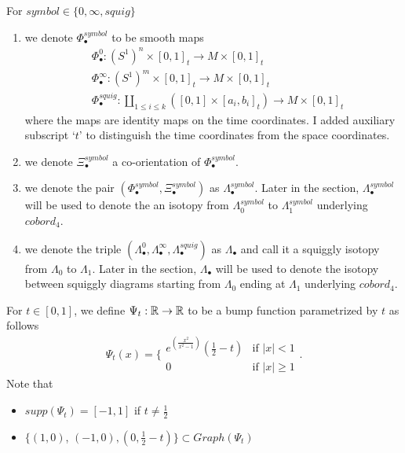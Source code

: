 \begin{definition}
For $symbol\in\{0,\infty, squig \}$
\begin{enumerate}
\item we denote $\Phi_\bullet^{symbol}$ to be smooth maps
\begin{align*}
&\Phi_\bullet^0 : (S^1)^n \times [0,1]_t \rightarrow M \times [0,1]_t \\
&\Phi_\bullet^\infty : (S^1)^m \times [0,1]_t \rightarrow M \times [0,1]_t \\
&\Phi_\bullet^{squig} : \coprod_{1\leq i \leq k} ([0,1] \times [a_i,b_i]_t) \rightarrow M \times [0,1]_t
\end{align*}
where the maps are identity maps on the time coordinates. I added auxiliary subscript `$t$' to distinguish the time coordinates from the space coordinates.

\item we denote $\Xi_\bullet^{symbol}$ a co-orientation of $\Phi_\bullet^{symbol}$.

\item we denote the pair $(\Phi_\bullet^{symbol},\Xi_\bullet^{symbol})$ as $\Lambda_\bullet^{symbol}$. Later in the section, $\Lambda_\bullet^{symbol}$ will be used to denote the an isotopy from $\Lambda_0^{symbol}$ to $\Lambda_1^{symbol}$ underlying $cobord_4$.

\item we denote the triple $(\Lambda_\bullet^{0},\Lambda_\bullet^{\infty},\Lambda_\bullet^{squig})$ as $\Lambda_\bullet$ and call it a squiggly isotopy from $\Lambda_0$ to $\Lambda_1$. Later in the section, $\Lambda_\bullet$ will be used to denote the isotopy between squiggly diagrams starting from $\Lambda_0$ ending at $\Lambda_1$ underlying $cobord_4$.
\end{enumerate}
\end{definition}

\begin{definition}
For $t \in [0,1]$, we define $\Psi_t: \mathbb{R} \rightarrow \mathbb{R}$ to be a bump function parametrized by $t$ as follows
\[\Psi_t(x)=\bigg\{
\begin{array}{ll}
    e^{(\frac{x^2}{x^2 - 1})}(\frac{1}{2}-t) & \text{if } |x| < 1 \\
    0 & \text{if } |x| \geq 1
\end{array}
\bigg.
\]
Note that 
\begin{itemize}
\item $supp(\Psi_t) = [-1,1]$ if $t\neq \frac{1}{2}$

\item $\{(1,0)$, $(-1,0),(0, \frac{1}{2}-t)\} \subset Graph(\Psi_t)$
\end{itemize}
\end{definition}

